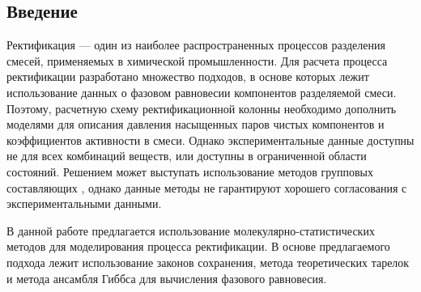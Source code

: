 \subsection*{Введение}

Ректификация --- один из наиболее распространенных процессов разделения смесей, применяемых в химической промышленности. Для расчета процесса ректификации разработано множество подходов, в основе которых лежит использование данных о фазовом равновесии компонентов разделяемой смеси. Поэтому, расчетную схему ректификационной колонны необходимо дополнить моделями для описания давления насыщенных паров чистых компонентов и коэффициентов активности в смеси. Однако экспериментальные данные доступны не для всех комбинаций веществ, или доступны в ограниченной области состояний. Решением может выступать использование методов групповых составляющих \cite{Skjold-Jorgensen1979,Tiegs1987,Wittig2003}, однако данные методы не гарантируют хорошего согласования с экспериментальными данными.

В данной работе предлагается использование молекулярно-статистических методов для моделирования процесса ректификации. В основе предлагаемого подхода лежит использование законов сохранения, метода теоретических тарелок и метода ансамбля Гиббса для вычисления фазового равновесия.
